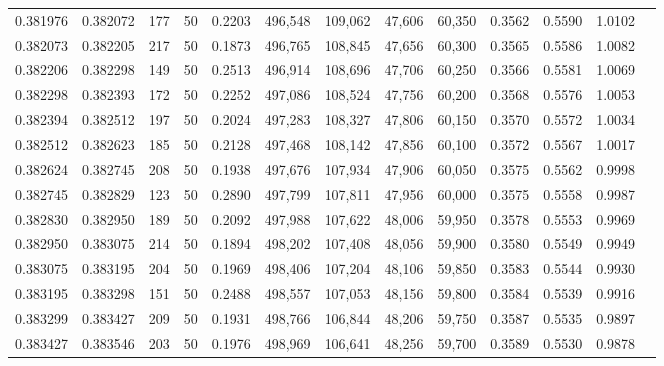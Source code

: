 \begin{tabular}{rrrrrrrrrrrrr}
0.381976 & 0.382072 &   177 &  50 &                                     0.2203 & 496,548 & 109,062 &  47,606 &  60,350 & 0.3562 & 0.5590 & 1.0102 \\
0.382073 & 0.382205 &   217 &  50 &                                     0.1873 & 496,765 & 108,845 &  47,656 &  60,300 & 0.3565 & 0.5586 & 1.0082 \\
0.382206 & 0.382298 &   149 &  50 &                                     0.2513 & 496,914 & 108,696 &  47,706 &  60,250 & 0.3566 & 0.5581 & 1.0069 \\
0.382298 & 0.382393 &   172 &  50 &                                     0.2252 & 497,086 & 108,524 &  47,756 &  60,200 & 0.3568 & 0.5576 & 1.0053 \\
0.382394 & 0.382512 &   197 &  50 &                                     0.2024 & 497,283 & 108,327 &  47,806 &  60,150 & 0.3570 & 0.5572 & 1.0034 \\
0.382512 & 0.382623 &   185 &  50 &                                     0.2128 & 497,468 & 108,142 &  47,856 &  60,100 & 0.3572 & 0.5567 & 1.0017 \\
0.382624 & 0.382745 &   208 &  50 &                                     0.1938 & 497,676 & 107,934 &  47,906 &  60,050 & 0.3575 & 0.5562 & 0.9998 \\
0.382745 & 0.382829 &   123 &  50 &                                     0.2890 & 497,799 & 107,811 &  47,956 &  60,000 & 0.3575 & 0.5558 & 0.9987 \\
0.382830 & 0.382950 &   189 &  50 &                                     0.2092 & 497,988 & 107,622 &  48,006 &  59,950 & 0.3578 & 0.5553 & 0.9969 \\
0.382950 & 0.383075 &   214 &  50 &                                     0.1894 & 498,202 & 107,408 &  48,056 &  59,900 & 0.3580 & 0.5549 & 0.9949 \\
0.383075 & 0.383195 &   204 &  50 &                                     0.1969 & 498,406 & 107,204 &  48,106 &  59,850 & 0.3583 & 0.5544 & 0.9930 \\
0.383195 & 0.383298 &   151 &  50 &                                     0.2488 & 498,557 & 107,053 &  48,156 &  59,800 & 0.3584 & 0.5539 & 0.9916 \\
0.383299 & 0.383427 &   209 &  50 &                                     0.1931 & 498,766 & 106,844 &  48,206 &  59,750 & 0.3587 & 0.5535 & 0.9897 \\
0.383427 & 0.383546 &   203 &  50 &                                     0.1976 & 498,969 & 106,641 &  48,256 &  59,700 & 0.3589 & 0.5530 & 0.9878 \\

\end{tabular}
